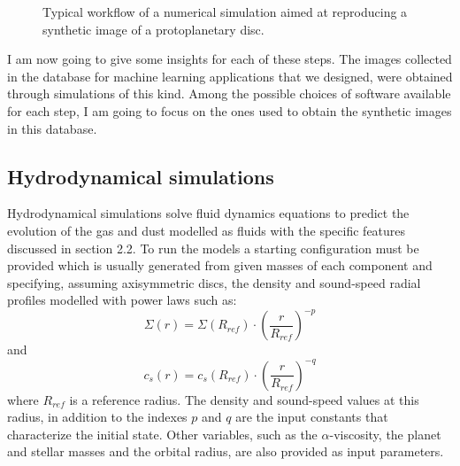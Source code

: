 \documentclass[a4paper,10pt]{report}
\begin{document}
\begin{figure}
\begin{center}
\begin{tikzpicture}

            \end{tikzpicture}
    \end{center}
    \caption{Typical workflow of a numerical simulation
     aimed at reproducing a synthetic image of a protoplanetary disc.}
\end{figure}

I am now going to give some insights for each of these steps. The images collected in the database for machine learning
applications that we designed, were obtained through simulations of this kind. Among the possible choices
of software available for each step, I am going to focus on the ones used to obtain the synthetic images
in this database.

\subsection{Hydrodynamical simulations}

Hydrodynamical simulations solve fluid dynamics equations to predict the evolution of the gas and dust 
modelled as fluids with the specific features discussed in section 2.2.
To run the models a starting configuration must be provided which is usually generated from given masses 
of each component and specifying, assuming axisymmetric discs, the density and sound-speed radial profiles modelled
with power laws such as:
\begin{equation}
    \Sigma(r) = \Sigma(R_{ref})\cdot\left(\frac{r}{R_{ref}}\right)^{-p}
\end{equation}
and
\begin{equation}
    c_s(r) = c_s(R_{ref})\cdot\left(\frac{r}{R_{ref}}\right)^{-q}
\end{equation}
where $R_{ref}$ is a reference radius. The density and sound-speed values at this radius, in addition to the indexes $p$ and $q$
are the input constants that characterize the initial state.
Other variables, such as the $\alpha$-viscosity, the planet and stellar masses and the orbital radius, are also provided as input parameters.
\end{document}
